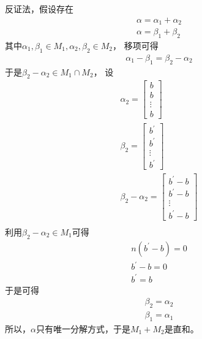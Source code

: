 \documentclass{article}
\begin{document}
\begin{itemize}
        反证法，假设存在
        \begin{align*}
          \alpha = \alpha_1 + \alpha_2 \\
          \alpha = \beta_1 + \beta_2
        \end{align*}
        其中$\alpha_1, \beta_1 \in M_1, \alpha_2, \beta_2 \in M_2$，
        移项可得
        \begin{align*}
          \alpha_1 - \beta_1 = \beta_2 - \alpha_2
        \end{align*}
        于是$\beta_2 - \alpha_2 \in M_1 \cap M_2$，
        设
        \begin{align*}
          \alpha_2 = \begin{bmatrix}
                       b      \\
                       b      \\
                       \vdots \\
                       b
                     \end{bmatrix}           \\
          \beta_2 = \begin{bmatrix}
                      b^\prime \\
                      b^\prime \\
                      \vdots   \\
                      b^\prime
                    \end{bmatrix}            \\
          \beta_2 - \alpha_2 = \begin{bmatrix}
                                 b^\prime - b \\
                                 b^\prime - b \\
                                 \vdots       \\
                                 b^\prime - b
                               \end{bmatrix} \\
        \end{align*}
        利用$\beta_2 - \alpha_2 \in M_1$可得
        \begin{align*}
          n(b^\prime - b) = 0 \\
          b^\prime - b = 0    \\
          b^\prime = b
        \end{align*}
        于是可得
        \begin{align*}
          \beta_2 = \alpha_2 \\
          \beta_1 = \alpha_1
        \end{align*}
        所以，$\alpha$只有唯一分解方式，于是$M_1 + M_2$是直和。

\end{itemize}
\end{document}
